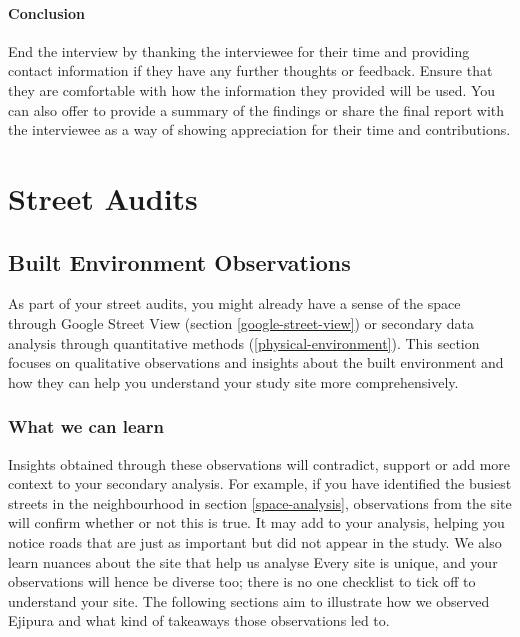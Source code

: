 \documentclass[
]{latex/krantz}
\begin{document}
\hypertarget{conclusion}{%
\paragraph*{Conclusion}\label{conclusion}}

End the interview by thanking the interviewee for their time and providing contact information if they have any further thoughts or feedback. Ensure that they are comfortable with how the information they provided will be used. You can also offer to provide a summary of the findings or share the final report with the interviewee as a way of showing appreciation for their time and contributions.

\hypertarget{street-audits}{%
\section{Street Audits}\label{street-audits}}

\hypertarget{built-environment-observations}{%
\subsection{Built Environment Observations}\label{built-environment-observations}}

As part of your street audits, you might already have a sense of the space through Google Street View (section \ref{google-street-view}) or secondary data analysis through quantitative methods (\ref{physical-environment}). This section focuses on qualitative observations and insights about the built environment and how they can help you understand your study site more comprehensively.

\hypertarget{learn-observations}{%
\subsubsection{What we can learn}\label{learn-observations}}

Insights obtained through these observations will contradict, support or add more context to your secondary analysis. For example, if you have identified the busiest streets in the neighbourhood in section \ref{space-analysis}, observations from the site will confirm whether or not this is true. It may add to your analysis, helping you notice roads that are just as important but did not appear in the study. We also learn nuances about the site that help us analyse Every site is unique, and your observations will hence be diverse too; there is no one checklist to tick off to understand your site. The following sections aim to illustrate how we observed Ejipura and what kind of takeaways those observations led to.
\end{document}
